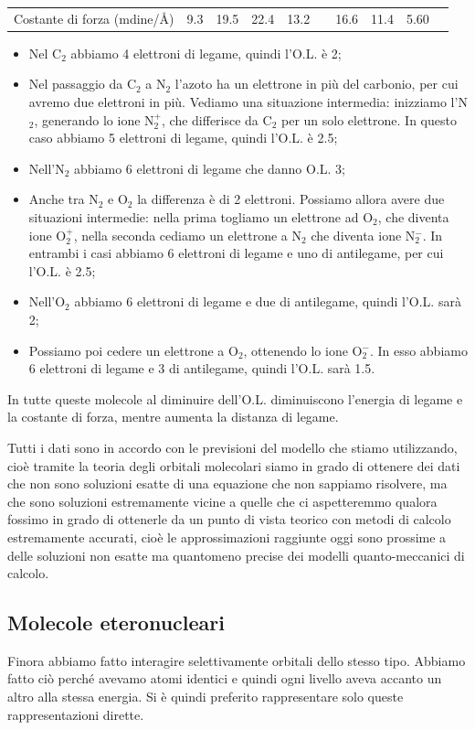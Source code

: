 \begin{center}
\begin{tabular}{ m{3cm}m{1cm}m{1cm}m{1cm}m{1cm}|m{1cm}m{1cm}m{1cm}m{1cm}m{1cm}}
        \vspace{0.2cm}Costante di forza (mdine/Å) & 9.3 & 19.5 & 22.4 & 13.2 & & 16.6 & 11.4 & 5.60
    \end{tabular}
\end{center}

\begin{itemize}
    \item Nel C$_2$ abbiamo 4 elettroni di legame, quindi l'O.L. è 2;
    \item Nel passaggio da C$_2$ a N$_2$ l'azoto ha un elettrone in più del carbonio, per cui avremo due elettroni in più. Vediamo una situazione intermedia: inizziamo l'N$_2$, generando lo ione N$_2^+$, che differisce da C$_2$ per un solo elettrone. In questo caso abbiamo 5 elettroni di legame, quindi l'O.L. è 2.5;
    \item Nell'N$_2$ abbiamo 6 elettroni di legame che danno O.L. 3;
    \item Anche tra N$_2$ e O$_2$ la differenza è di 2 elettroni. Possiamo allora avere due situazioni intermedie: nella prima togliamo un elettrone ad O$_2$, che diventa ione O$_2^+$, nella seconda cediamo un elettrone a N$_2$ che diventa ione N$_2^-$. In entrambi i casi abbiamo 6 elettroni di legame e uno di antilegame, per cui l'O.L. è 2.5;
    \item Nell'O$_2$ abbiamo 6 elettroni di legame e due di antilegame, quindi l'O.L. sarà 2;
    \item Possiamo poi cedere un elettrone a O$_2$, ottenendo lo ione O$_2^-$. In esso abbiamo 6 elettroni di legame e 3 di antilegame, quindi l'O.L. sarà 1.5.
\end{itemize}

In tutte queste molecole al diminuire dell'O.L. diminuiscono l'energia di legame e la costante di forza, mentre aumenta la distanza di legame.

Tutti i dati sono in accordo con le previsioni del modello che stiamo utilizzando, cioè tramite la teoria degli orbitali molecolari siamo in grado di ottenere dei dati che non sono soluzioni esatte di una equazione che non sappiamo risolvere, ma che sono soluzioni estremamente vicine a quelle che ci aspetteremmo qualora fossimo in grado di ottenerle da un punto di vista teorico con metodi di calcolo estremamente accurati, cioè le approssimazioni raggiunte oggi sono prossime a delle soluzioni non esatte ma quantomeno precise dei modelli quanto-meccanici di calcolo.

\subsection{Molecole eteronucleari}
Finora abbiamo fatto interagire selettivamente orbitali dello stesso tipo. Abbiamo fatto ciò perché avevamo atomi identici e quindi ogni livello aveva accanto un altro alla stessa energia. Si è quindi preferito rappresentare solo queste rappresentazioni dirette.

